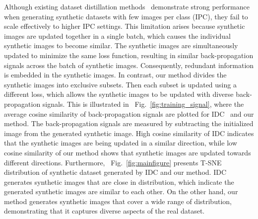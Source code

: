 \documentclass{article}
\theoremstyle{plain}
\theoremstyle{definition}
\theoremstyle{remark}
\begin{document}
Although existing dataset distillation methods~\cite{} demonstrate strong performance when generating synthetic datasets with few images per class (IPC), they fail to scale effectively to higher IPC settings.
This limitation arises because synthetic images are updated together in a single batch, which causes the individual synthetic images to become similar.
The synthetic images are simultaneously updated to minimize the same loss function, resulting in similar back-propagation signals across the batch of synthetic images.
Consequently, redundant information is embedded in the synthetic images. In contrast, our method divides the synthetic images into exclusive subsets.
Then each subset is updated using a different loss, which allows the synthetic images to be updated with diverse back-propagation signals.
This is illustrated in ~Fig.~\ref{fig:training_signal}, where the average cosine similarity of back-propagation signals are plotted for IDC~\cite{} and our method.
The back-propagation signals are measured by subtracting the initialized image from the generated synthetic image.
High cosine similarity of IDC indicates that the synthetic images are being updated in a similar direction, while low cosine similarity of our method shows that synthetic images are updated towards different directions.
Furthermore, ~Fig.~\ref{fig:mainfigure} presents T-SNE~\cite{} distribution of synthetic dataset generated by IDC and our method.
IDC generates synthetic images that are close in distribution, which indicate the generated synthetic images are similar to each other.
On the other hand, our method generates synthetic images that cover a wide range of distribution, demonstrating that it captures diverse aspects of the real dataset.

\end{document}
